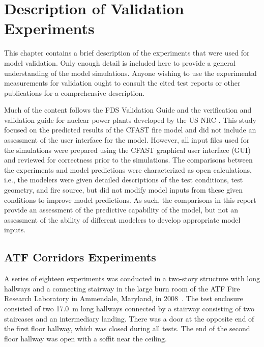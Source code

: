 
\chapter{Description of Validation Experiments}

\label{Experiment_Chapter}

This chapter contains a brief description of the experiments that were used for model validation. Only enough detail is included here to provide a general understanding of the model simulations. Anyone wishing to use the experimental measurements for validation ought to consult the cited test reports or other publications for a comprehensive description.

Much of the content follows the FDS Validation Guide \cite{FDS_Validation_Guide_6} and the verification and validation guide for nuclear power plants developed by the US NRC \cite{NRCNUREG1824}. This study focused on the predicted results of the CFAST fire model and did not include an assessment of the user interface for the model.  However, all input files used for the simulations were prepared using the CFAST graphical user interface (GUI) and reviewed for correctness prior to the simulations.  The comparisons between the experiments and model predictions were characterized as open calculations, i.e., the modelers were given detailed descriptions of the test conditions, test geometry, and fire source, but did not modify model inputs from these given conditions to improve model predictions.  As such, the comparisons in this report provide an assessment of the predictive capability of the model, but not an assessment of the ability of different modelers to develop appropriate model inputs.


\FloatBarrier

\section{ATF Corridors Experiments}

A series of eighteen experiments was conducted in a two-story structure with long hallways and a connecting stairway
in the large burn room of the ATF Fire Research Laboratory in Ammendale, Maryland, in 2008~\cite{Sheppard:Corridors}.
The test enclosure consisted of two 17.0~m long hallways connected by a
stairway consisting of two staircases and an intermediary landing.
There was a door at the opposite end of the first floor hallway, which was closed during all tests.
The end of the second floor hallway was open with a soffit near the ceiling.

